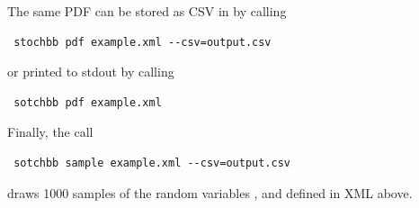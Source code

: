 The same PDF can be stored as CSV in  by calling
\begin{lstlisting}
 stochbb pdf example.xml --csv=output.csv
\end{lstlisting}
or printed to stdout by calling 
\begin{lstlisting}
 sotchbb pdf example.xml
\end{lstlisting}

Finally, the call
\begin{lstlisting}
 sotchbb sample example.xml --csv=output.csv
\end{lstlisting}
draws 1000 samples of the random variables ,  and  defined in XML above.
